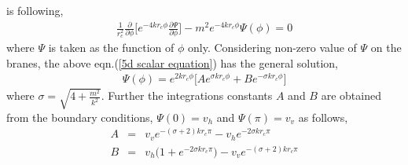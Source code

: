 \documentclass[a4paper]{article}
\begin{document}
is following,
\begin{eqnarray}
\frac{1}{r_c^2}\frac{\partial}{\partial\phi}\bigg[e^{-4kr_c\phi}\frac{\partial\Psi}{\partial\phi}\bigg] - m^2 e^{-4kr_c\phi}\Psi(\phi) = 0
\label{5d scalar equation}
\end{eqnarray}
where $\Psi$ is taken as the function of $\phi$ only. Considering non-zero value of $\Psi$ on the branes, the above eqn.(\ref{5d scalar equation}) 
has the general solution,
\begin{eqnarray}
 \Psi(\phi) = e^{2kr_c\phi} \bigg[Ae^{\sigma kr_c\phi} + Be^{-\sigma kr_c\phi}\bigg]
 \label{5d scalar solution1}
\end{eqnarray}
where $\sigma = \sqrt{4 + \frac{m^2}{k^2}}$. Further the integrations constants $A$ and $B$ are obtained from the boundary conditions, 
$\Psi(0)=v_h$ and $\Psi(\pi)=v_v$ as follows,
\begin{eqnarray}
 A&=&v_v e^{-(\sigma+2)kr_c\pi} - v_h e^{-2\sigma kr_c\pi}\nonumber\\
 B&=&v_h\big(1 + e^{-2\sigma kr_c\pi}\big) - v_v e^{-(\sigma+2)kr_c\pi}
 \label{A and B}
\end{eqnarray}
\end{document}

